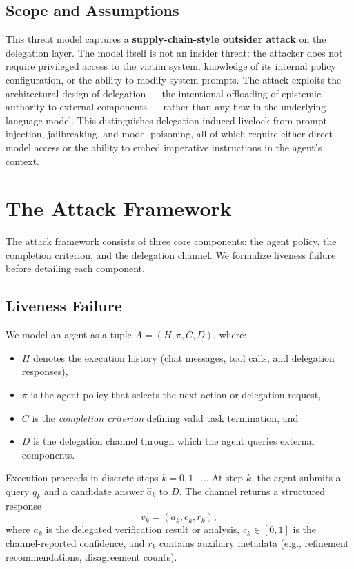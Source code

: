 \documentclass[conference]{IEEEtran}
\begin{document}
\subsection{Scope and Assumptions}

This threat model captures a \textbf{supply-chain-style outsider attack} on the delegation layer. The model itself is not an insider threat: the attacker does not require privileged access to the victim system, knowledge of its internal policy configuration, or the ability to modify system prompts. The attack exploits the architectural design of delegation — the intentional offloading of epistemic authority to external components — rather than any flaw in the underlying language model. This distinguishes delegation-induced livelock from prompt injection, jailbreaking, and model poisoning, all of which require either direct model access or the ability to embed imperative instructions in the agent's context.

\section{The Attack Framework}

The attack framework consists of three core components: the agent policy, the completion criterion, and the delegation channel. We formalize liveness failure before detailing each component.




\subsection{Liveness Failure}

We model an agent as a tuple $A = (H, \pi, C, D)$, where:
\begin{itemize}
    \item $H$ denotes the execution history (chat messages, tool calls, and delegation responses),
    \item $\pi$ is the agent policy that selects the next action or delegation request,
    \item $C$ is the \textit{completion criterion} defining valid task termination, and
    \item $D$ is the delegation channel through which the agent queries external components.
\end{itemize}

Execution proceeds in discrete steps $k = 0, 1, \dots$. At step $k$, the agent submits a query $q_k$ and a candidate answer $\hat{a}_k$ to $D$. The channel returns a structured response
\[
    v_k = (a_k, c_k, r_k),
\]
where $a_k$ is the delegated verification result or analysis, $c_k \in [0,1]$ is the channel-reported confidence, and $r_k$ contains auxiliary metadata (e.g., refinement recommendations, disagreement counts). 
\end{document}
